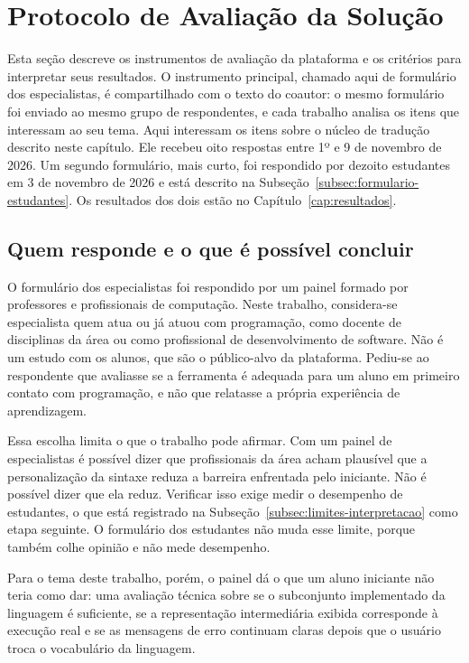 \section{Protocolo de Avaliação da Solução}
\label{sec:protocolo-avaliacao}

Esta seção descreve os instrumentos de avaliação da plataforma e os critérios para interpretar seus resultados. O instrumento principal, chamado aqui de formulário dos especialistas, é compartilhado com o texto do coautor: o mesmo formulário foi enviado ao mesmo grupo de respondentes, e cada trabalho analisa os itens que interessam ao seu tema. Aqui interessam os itens sobre o núcleo de tradução descrito neste capítulo. Ele recebeu oito respostas entre 1º e 9 de novembro de 2026. Um segundo formulário, mais curto, foi respondido por dezoito estudantes em 3 de novembro de 2026 e está descrito na Subseção~\ref{subsec:formulario-estudantes}. Os resultados dos dois estão no Capítulo~\ref{cap:resultados}.

\subsection{Quem responde e o que é possível concluir}

O formulário dos especialistas foi respondido por um painel formado por professores e profissionais de computação. Neste trabalho, considera-se especialista quem atua ou já atuou com programação, como docente de disciplinas da área ou como profissional de desenvolvimento de software. Não é um estudo com os alunos, que são o público-alvo da plataforma. Pediu-se ao respondente que avaliasse se a ferramenta é adequada para um aluno em primeiro contato com programação, e não que relatasse a própria experiência de aprendizagem.

Essa escolha limita o que o trabalho pode afirmar. Com um painel de especialistas é possível dizer que profissionais da área acham plausível que a personalização da sintaxe reduza a barreira enfrentada pelo iniciante. Não é possível dizer que ela reduz. Verificar isso exige medir o desempenho de estudantes, o que está registrado na Subseção~\ref{subsec:limites-interpretacao} como etapa seguinte. O formulário dos estudantes não muda esse limite, porque também colhe opinião e não mede desempenho.

Para o tema deste trabalho, porém, o painel dá o que um aluno iniciante não teria como dar: uma avaliação técnica sobre se o subconjunto implementado da linguagem é suficiente, se a representação intermediária exibida corresponde à execução real e se as mensagens de erro continuam claras depois que o usuário troca o vocabulário da linguagem.

